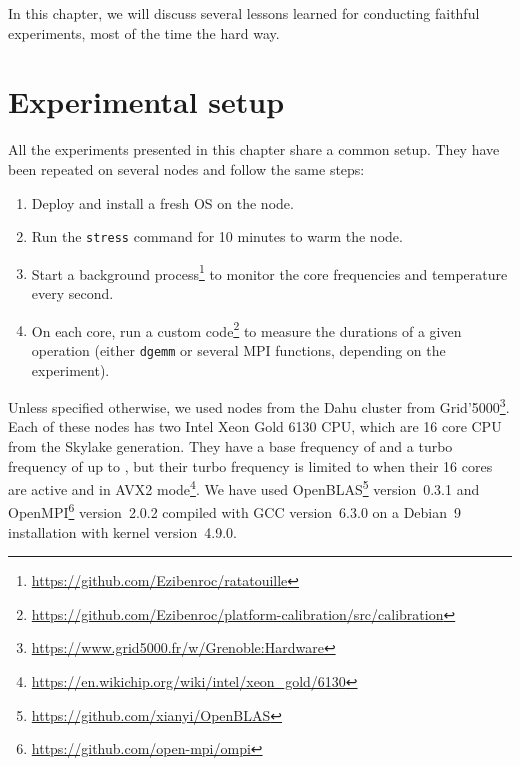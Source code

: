     In this chapter, we will discuss several lessons learned for conducting faithful experiments, most of the time the
    hard way.

    \section{Experimental setup}%
    \label{sec:experimental_setup}

        All the experiments presented in this chapter share a common setup. They have been repeated on several nodes and
        follow the same steps:
        \begin{enumerate}
            \item Deploy and install a fresh OS on the node.
            \item Run the \texttt{stress} command for 10 minutes to warm the node.
            \item Start a background process\footnote{\url{https://github.com/Ezibenroc/ratatouille}} to monitor the
                core frequencies and temperature every second.
            \item On each core, run a custom
                code\footnote{\url{https://github.com/Ezibenroc/platform-calibration/src/calibration}}
                to measure the durations of a given operation (either \texttt{dgemm} or several MPI functions, depending
                on the experiment).
        \end{enumerate}

        Unless specified otherwise, we used nodes from the Dahu cluster from
        Grid'5000\footnote{\url{https://www.grid5000.fr/w/Grenoble:Hardware}}. Each of these nodes has two Intel Xeon
        Gold 6130 CPU, which are 16 core CPU from the Skylake generation. They have a base frequency of
         and a turbo frequency of up to , but their turbo frequency is
        limited to  when their 16 cores are active and in AVX2
        mode\footnote{\url{https://en.wikichip.org/wiki/intel/xeon\_gold/6130}}. We have used
        OpenBLAS\footnote{\url{https://github.com/xianyi/OpenBLAS}} version~0.3.1 and
        OpenMPI\footnote{\url{https://github.com/open-mpi/ompi}} version~2.0.2 compiled with GCC version~6.3.0 on a
        Debian~9 installation with kernel version~4.9.0.

